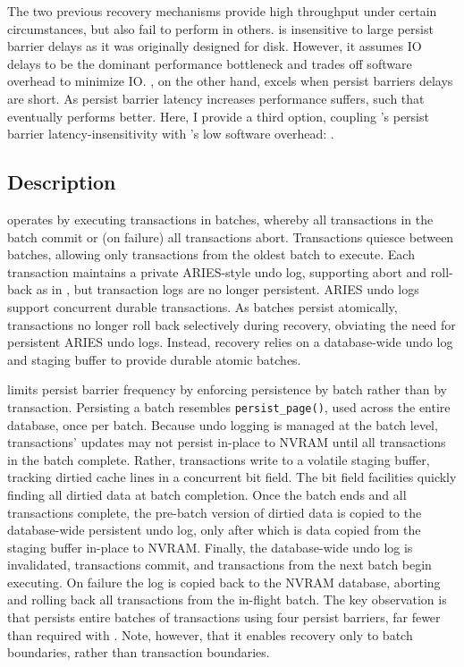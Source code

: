 The two previous recovery mechanisms provide high throughput under certain circumstances, but also fail to perform in others.
\NVDisk is insensitive to large persist barrier delays as it was originally designed for disk.
However, it assumes IO delays to be the dominant performance bottleneck and trades off software overhead to minimize IO.
\InPlace, on the other hand, excels when persist barriers delays are short.
As persist barrier latency increases performance suffers, such that \NVDisk eventually performs better.
Here, I provide a third option, coupling \NVDisk's persist barrier latency-insensitivity with \InPlace's low software overhead: \GroupCommit.

\subsection{Description}
\label{sec::OLTP_design:GroupCommit:Proposed}

\GroupCommit operates by executing transactions in batches, whereby all transactions in the batch commit or (on failure) all transactions abort.
Transactions quiesce between batches, allowing only transactions from the oldest batch to execute.
Each transaction maintains a private ARIES-style undo log, supporting abort and roll-back as in \InPlace, but transaction logs are no longer persistent.
ARIES undo logs support concurrent durable transactions.
As batches persist atomically, transactions no longer roll back selectively during recovery, obviating the need for persistent ARIES undo logs.
Instead, recovery relies on a database-wide undo log and staging buffer to provide durable atomic batches.

\GroupCommit limits persist barrier frequen\-cy by enforcing persistence by batch rather than by transaction.
Persisting a batch resembles \texttt{persist\_page()}, used across the entire database, once per batch.
Because undo logging is managed at the batch level, transactions' updates may not persist in-place to NVRAM until all transactions in the batch complete.
Rather, transactions write to a volatile staging buffer, tracking dirtied cache lines in a concurrent bit field.
The bit field facilities quickly finding all dirtied data at batch completion.
Once the batch ends and all transactions complete, the pre-batch version of dirtied data is copied to the database-wide persistent undo log, only after which is data copied from the staging buffer in-place to NVRAM.
Finally, the database-wide undo log is invalidated, transactions commit, and transactions from the next batch begin executing.
On failure the log is copied back to the NVRAM database, aborting and rolling back all transactions from the in-flight batch.
The key observation is that \GroupCommit persists entire batches of transactions using four persist barriers, far fewer than required with \InPlace.  Note, however, that it enables recovery only to batch boundaries, rather than transaction boundaries.

